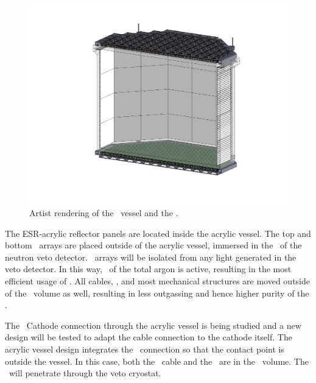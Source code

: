 \begin{figure}[!thbp]
\centering
\includegraphics[width=\columnwidth]{./Figures/TPC-acrylic-vessel-design.pdf}
\caption[Artist rendering of the \PMMA\ vessel and the \TPC]{Artist rendering of the \PMMA\ vessel and the \TPC.}
\label{fig:TPC_acrylic}
\end{figure}

The ESR-acrylic reflector panels are located inside the acrylic vessel. The top and bottom \DSkPdm\ arrays are placed outside of the acrylic vessel, immersed in the \AAr\ of the neutron veto detector. \DSkPdm\ arrays will be isolated from any light generated in the veto detector.  In this way, \DSkActiveMassRatio\ of the total argon is active, resulting in the most efficient usage of \UAr. All cables, \HVFTs, and most mechanical structures are moved outside of the \UAr\ volume as well, resulting in less outgassing and hence higher purity of the \UAr. 

The \HV\ Cathode connection through the acrylic vessel is being studied and a new design will be tested to adapt the cable connection to the cathode itself. The acrylic vessel design integrates the \HV\ connection so that the contact point is outside the vessel. In this case, both the \HV\ cable and the \HVFT\ are in the \AAr\ volume. The \HVFT\ will penetrate through the veto cryostat.


